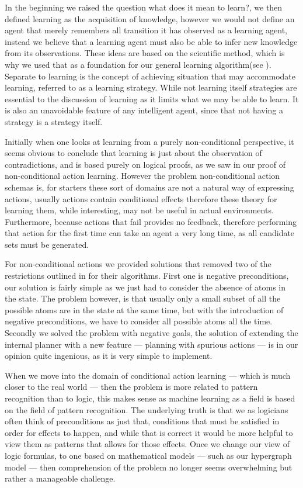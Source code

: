 \documentclass[Master.tex]{subfiles}
\begin{document}
	In the beginning we raised the question what does it mean to learn?, we then defined learning as the acquisition of knowledge, 
	however we would not define an agent that merely remembers all transition it has observed as a learning agent,
	instead we believe that a learning agent must also be able to infer new knowledge from its observations.
	These ideas are based on the scientific method, which is why we used that as a foundation for our general learning algorithm(see ). 
	Separate to learning is the concept of achieving situation that may accommodate learning, referred to as a learning strategy.
	While not learning itself strategies are essential to the discussion of learning as it limits what we may be able to learn. 
	It is also an unavoidable feature of any intelligent agent, since that not having a strategy is a strategy itself. 


	Initially when one looks at learning from a purely non-conditional perspective, 
	it seems obvious to conclude that learning is just about the observation of contradictions,
	and is based purely on logical proofs, as we saw in our proof of non-conditional action learning.
	However the problem non-conditional action schemas is, for starters 
	these sort of domains are not a natural way of expressing actions, 
	usually actions contain conditional effects therefore these theory for learning them, 
	while interesting, may not be useful in actual environments.
	Furthermore, because actions that fail provides no feedback, 
	therefore performing that action for the first time can take an agent a very long time, as all candidate sets must be generated.
	
	For non-conditional actions we provided solutions that removed two of the restrictions outlined in \cite{Walsh2008} for their algorithms.
	First one is negative preconditions, our solution is fairly simple as we just had to consider the absence of atoms in the state.
	The problem however, is that usually only a small subset of all the possible atoms are in the state at the same time, 
	but with the introduction of negative preconditions, we have to consider all possible atoms all the time.
	Secondly we solved the problem with negative goals, the solution of extending the internal planner with a new feature --- planning with spurious actions --- is in our opinion quite ingenious, as it is very simple to implement. 
	
	
	When we move into the domain of conditional action learning --- which is much closer to the real world --- 
	then the problem is more related to pattern recognition than to logic, this makes sense as machine learning as a field is based on the field of pattern recognition. 
	The underlying truth is that we as logicians often think of preconditions as just that, conditions that must be satisfied in order for effects to happen, and while that is correct it would be more helpful to view them as patterns that allows for those effects.
	Once we change our view of logic formulas, to one based on mathematical models --- such as our hypergraph model ---	then comprehension of the problem no longer seems overwhelming but rather a manageable challenge. 
	
\end{document}

